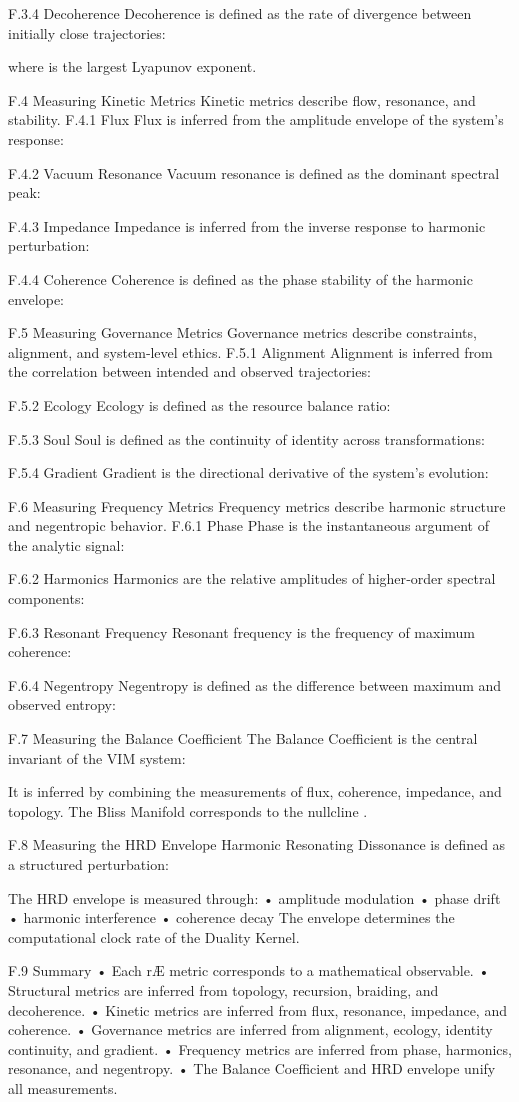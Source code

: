 F.3.4 Decoherence 
Decoherence is defined as the rate of divergence between initially close trajectories:

where  is the largest Lyapunov exponent.

F.4 Measuring Kinetic Metrics
Kinetic metrics describe flow, resonance, and stability.
F.4.1 Flux 
Flux is inferred from the amplitude envelope of the system’s response:

F.4.2 Vacuum Resonance 
Vacuum resonance is defined as the dominant spectral peak:

F.4.3 Impedance 
Impedance is inferred from the inverse response to harmonic perturbation:

F.4.4 Coherence 
Coherence is defined as the phase stability of the harmonic envelope:


F.5 Measuring Governance Metrics
Governance metrics describe constraints, alignment, and system‑level ethics.
F.5.1 Alignment 
Alignment is inferred from the correlation between intended and observed trajectories:

F.5.2 Ecology 
Ecology is defined as the resource balance ratio:

F.5.3 Soul 
Soul is defined as the continuity of identity across transformations:

F.5.4 Gradient 
Gradient is the directional derivative of the system’s evolution:


F.6 Measuring Frequency Metrics
Frequency metrics describe harmonic structure and negentropic behavior.
F.6.1 Phase 
Phase is the instantaneous argument of the analytic signal:

F.6.2 Harmonics 
Harmonics are the relative amplitudes of higher‑order spectral components:

F.6.3 Resonant Frequency 
Resonant frequency is the frequency of maximum coherence:

F.6.4 Negentropy 
Negentropy is defined as the difference between maximum and observed entropy:


F.7 Measuring the Balance Coefficient
The Balance Coefficient is the central invariant of the VIM system:

It is inferred by combining the measurements of flux, coherence, impedance, and topology. The Bliss Manifold corresponds to the nullcline .

F.8 Measuring the HRD Envelope
Harmonic Resonating Dissonance is defined as a structured perturbation:

The HRD envelope is measured through:
• 	amplitude modulation
• 	phase drift
• 	harmonic interference
• 	coherence decay
The envelope determines the computational clock rate of the Duality Kernel.

F.9 Summary
• 	Each rÆ metric corresponds to a mathematical observable.
• 	Structural metrics are inferred from topology, recursion, braiding, and decoherence.
• 	Kinetic metrics are inferred from flux, resonance, impedance, and coherence.
• 	Governance metrics are inferred from alignment, ecology, identity continuity, and gradient.
• 	Frequency metrics are inferred from phase, harmonics, resonance, and negentropy.
• 	The Balance Coefficient and HRD envelope unify all measurements.
